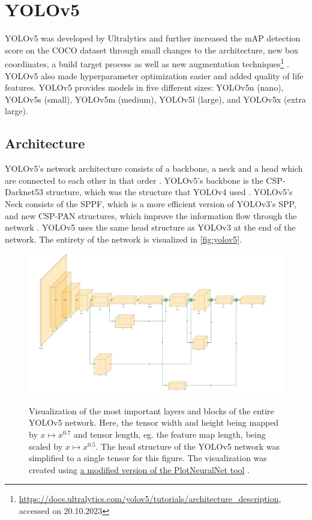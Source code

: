 \documentclass[10pt]{book}
\newcommand{\figureref}[1]{\autoref{#1}}
\begin{document}
\section{YOLOv5}

\ac{YOLO}v5 was developed by Ultralytics and further increased the mAP detection score on the \ac{COCO} dataset through small changes to the architecture, new box coordinates, a build target process as well as new augmentation techniques\footnote{\url{https://docs.ultralytics.com/yolov5/tutorials/architecture_description}, accessed on 20.10.2023} \cite{gjocher2022yolov5,terven2023comprehensive}. \ac{YOLO}v5 also made hyperparameter optimization easier and added quality of life features. \ac{YOLO}v5 provides models in five different sizes: \ac{YOLO}v5n (nano), \ac{YOLO}v5s (small), \ac{YOLO}v5m (medium), \ac{YOLO}v5l (large), and \ac{YOLO}v5x (extra large).

\subsection{Architecture}

\ac{YOLO}v5's network architecture consists of a backbone, a neck and a head which are connected to each other in that order \cite{jani2023model}. \ac{YOLO}v5's backbone is the CSP-Darknet53 structure, which was the structure that \ac{YOLO}v4 used \cite{bochkovskiy2020yolov4}. \ac{YOLO}v5's Neck consists of the \ac{SPPF}, which is a more efficient version of \ac{YOLO}v3's \ac{SPP}, and new \ac{CSP-PAN} structures, which improve the information flow through the network \cite{liu2018path}. \ac{YOLO}v5 uses the same head structure as \ac{YOLO}v3 at the end of the network. The entirety of the network is visualized in \figureref{fig:yolov5}.

\begin{figure}
  \caption{Visualization of the most important layers and blocks of the entire \ac{YOLO}v5 network. Here, the tensor width and height being mapped by $x \mapsto x^{0.7}$ and tensor length, eg. the feature map length, being scaled by $x \mapsto x^{0.5}$. The head structure of the \ac{YOLO}v5 network was simplified to a single tensor for this figure. The visualization was created using \href{https://github.com/jnccd/PlotNeuralNet}{a modified version of the PlotNeuralNet tool} \cite{haris_iqbal_2018_2526396}.}
  \includegraphics[width=\textwidth]{image/yolov5}
  \label{fig:yolov5}
\end{figure}
\end{document}

